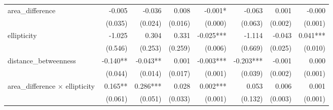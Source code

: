 \begin{tabular}{lrrrrrrr}
area\_difference                           &                       -0.005 &                     -0.036 &                        0.008 &                          -0.001* &                         -0.063 &                                                             0.001 &                                              -0.000 \\ 
                                           &                      (0.035) &                    (0.024) &                      (0.016) &                          (0.000) &                        (0.063) &                                                           (0.002) &                                             (0.001) \\ 
ellipticity                                &                       -1.025 &                      0.304 &                        0.331 &                        -0.025*** &                         -1.114 &                                                            -0.043 &                                            0.041*** \\ 
                                           &                      (0.546) &                    (0.253) &                      (0.259) &                          (0.006) &                        (0.669) &                                                           (0.025) &                                             (0.010) \\ 
distance\_betweenness                      &                     -0.140** &                   -0.043** &                        0.001 &                        -0.003*** &                      -0.203*** &                                                            -0.001 &                                               0.000 \\ 
                                           &                      (0.044) &                    (0.014) &                      (0.017) &                          (0.001) &                        (0.039) &                                                           (0.002) &                                             (0.001) \\ 
area\_difference $\times$ ellipticity      &                      0.165** &                   0.286*** &                        0.028 &                         0.002*** &                          0.053 &                                                             0.006 &                                               0.001 \\ 
                                           &                      (0.061) &                    (0.051) &                      (0.033) &                          (0.001) &                        (0.132) &                                                           (0.003) &                                             (0.001) \\ 

\end{tabular}
